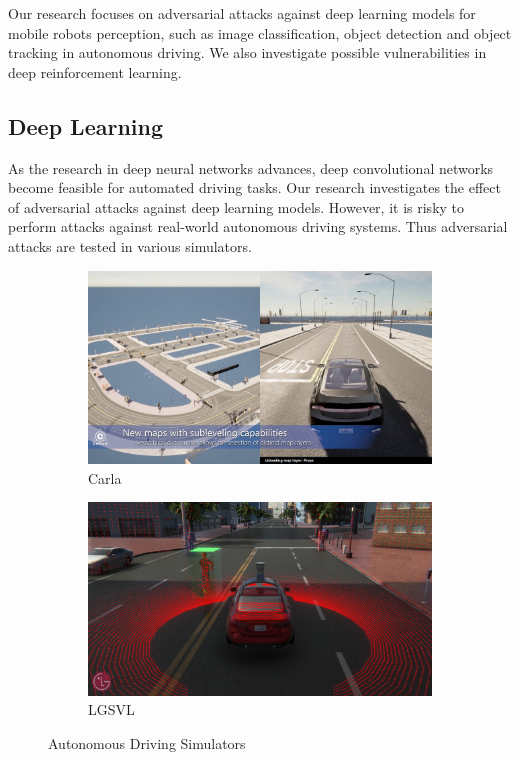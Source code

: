 Our research focuses on adversarial attacks against deep learning models for mobile robots perception, such as image classification, object detection and object tracking in autonomous driving. We also investigate possible vulnerabilities in deep reinforcement learning.


\subsection{Deep Learning}
\label{sec:deep_robot}

As the research in deep neural networks advances, deep convolutional networks become feasible for automated driving tasks. Our research investigates the effect of adversarial attacks against deep learning models. However, it is risky to perform attacks against real-world autonomous driving systems. Thus adversarial attacks are tested in various simulators.

\begin{figure}[H]
\centering
\begin{subfigure}[b]{0.485\textwidth}
    \centering
    \includegraphics[width=\textwidth]{figures/chapter_intro/carla.jpg}
    \caption{Carla}
    \label{fig:carla_intro}
\end{subfigure}
\hfill
\begin{subfigure}[b]{0.485\textwidth}
    \centering
    \includegraphics[width=\textwidth]{figures/chapter_intro/lgsvl.png}
    \caption{LGSVL}
    \label{fig:lvsvl}
\end{subfigure}
\hfill
\caption{Autonomous Driving Simulators}
\label{fig.simulator}
\end{figure}

